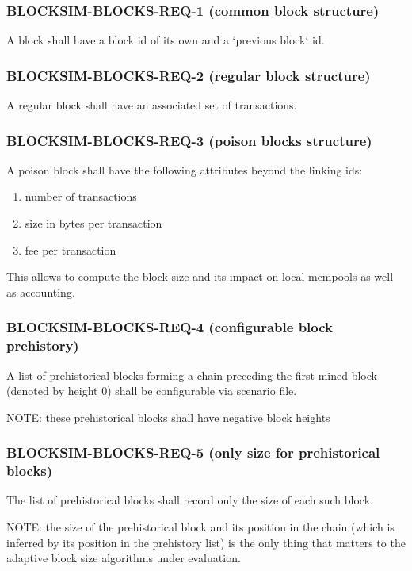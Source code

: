 \documentclass{scrreprt}
\begin{document}
\subsubsection{BLOCKSIM-BLOCKS-REQ-1 (common block structure)}

A block shall have a block id of its own and a `previous block` id.


\subsubsection{BLOCKSIM-BLOCKS-REQ-2 (regular block structure)}

A regular block shall have an associated set of transactions.


\subsubsection{BLOCKSIM-BLOCKS-REQ-3 (poison blocks structure)}

A poison block shall have the following attributes beyond the linking ids:

\begin{enumerate}
   \item number of transactions
   \item size in bytes per transaction
   \item fee per transaction
\end{enumerate}

This allows to compute the block size and its impact on local mempools
as well as accounting.

\subsubsection{BLOCKSIM-BLOCKS-REQ-4 (configurable block prehistory)}

A list of prehistorical blocks forming a chain preceding the first mined
block (denoted by height 0) shall be configurable via scenario file.

NOTE: these prehistorical blocks shall have negative block heights

\subsubsection{BLOCKSIM-BLOCKS-REQ-5 (only size for prehistorical blocks)}

The list of prehistorical blocks shall record only the size of each such
block.

NOTE: the size of the prehistorical block and its position in the chain
(which is inferred by its position in the prehistory list) is the only thing
that matters to the adaptive block size algorithms under evaluation.
\end{document}
